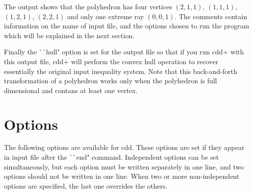The output shows that the polyhedron has four vertices
$(2,1,1)$, $(1,1,1)$, $(1,2,1)$, $(2,2,1)$ and
only one extreme ray $(0,0,1)$.  The comments contain
information on the name of input file, and the options
chosen to run the program which will be explained in
the next section.  

Finally the ^^ ^^ hull" option is  set for
the output file so that if you run cdd+ with this output file,
cdd+ will perform the convex hull operation to recover 
essentially the original input inequality system.  Note that
this back-and-forth transformation of a polyhedron works
only when the polyhedron is full dimensional and contans
at least one vertex.

\section{Options}  \label{OPTIONS}

The following options are available for cdd.  These options are
set if they appear in input file after the ^^ ^^ end" command.
Independent options can be set simultaneously, but each option
must be written separately in one line, and  two options
should not be written in one line.  When two or more non-independent
options are specified, the last one overrides the others.

